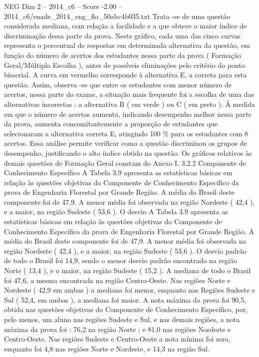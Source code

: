 \begin{textsample}{NEG Dim 2 – 2014\_c6 – Score -2.00 – 2014\_c6/enade\_2014\_eng\_flo\_50abc4b035.txt}
Trata -se de uma questão considerada mediana, com relação a facilidade e a que obteve o maior índice de discriminação dessa parte da prova.
Neste gráfico, cada uma das cinco curvas representa o percentual de respostas em determinada alternativa da questão, em função do número de acertos dos estudantes nessa parte da prova ( Formação Geral/Múltipla Escolha ), antes de possíveis eliminações pelo critério do ponto bisserial.
A curva em vermelho corresponde à alternativa E, a correta para esta questão.
Assim, observa -se que entre os estudantes com menor número de acertos, nessa parte do exame, a situação mais frequente foi a escolha de uma das alternativas incorretas : a alternativa B ( em verde ) ou C ( em preto ).
À medida em que o número de acertos aumenta, indicando desempenho melhor nessa parte da prova, aumenta concomitantemente a proporção de estudantes que selecionaram a alternativa correta E, atingindo 100 \% para os estudantes com 8 acertos.
Essa análise permite verificar como a questão discriminou os grupos de desempenho, justificando o alto índice obtido na questão.
Os gráficos relativos às demais questões de Formação Geral constam do Anexo I. 3.2.2 Componente de Conhecimento Específico A Tabela 3.9 apresenta as estatísticas básicas em relação às questões objetivas do Componente de Conhecimento Específico da prova de Engenharia Florestal por Grande Região.
A média do Brasil deste componente foi de 47,9.
A menor média foi observada na região Nordeste ( 42,4 ), e a maior, na região Sudeste ( 53,6 ).
O desvio A Tabela 3.9 apresenta as estatísticas básicas em relação às questões objetivas do Componente de Conhecimento Específico da prova de Engenharia Florestal por Grande Região.
A média do Brasil deste componente foi de 47,9.
A menor média foi observada na região Nordeste ( 42,4 ), e a maior, na região Sudeste ( 53,6 ).
O desvio padrão de todo o Brasil foi 14,9, sendo o menor desvio padrão encontrado na região Norte ( 13,4 ), e o maior, na região Sudeste ( 15,2 ).
A mediana de todo o Brasil foi 47,6, a mesma encontrada na região Centro-Oeste.
Nas regiões Norte e Nordeste ( 42,9 em ambas ) a mediana foi menor, enquanto nas Regiões Sudeste e Sul ( 52,4, em ambas ), a mediana foi maior.
A nota máxima da prova foi 90,5, obtida nas questões objetivas do Componente de Conhecimento Específico, por, pelo menos, um aluno nas regiões Sudeste e Sul, e nas demais regiões, a nota máxima da prova foi : 76,2 na região Norte ; e 81,0 nas regiões Nordeste e Centro-Oeste.
Nas regiões Sudeste e Centro-Oeste a nota mínima foi zero, enquanto foi 4,8 nas regiões Norte e Nordeste, e 14,3 na região Sul.

\end{textsample}

